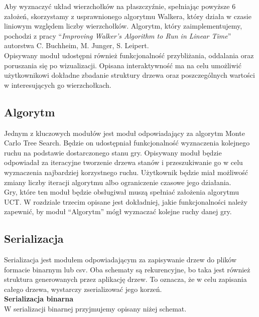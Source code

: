 \documentclass{article}
\begin{document}
	\noindent Aby wyznaczyć układ wierzchołków na płaszczyźnie, spełniając powyższe 6 założeń, skorzystamy z usprawnionego algorytmu Walkera, który działa w czasie liniowym względem liczby wierzchołków. Algorytm, który zaimplementujemy, pochodzi z pracy ``\textit{Improving Walker's Algorithm to Run in Linear Time}'' autorstwa C. Buchheim, M. Junger, S. Leipert. \\
	
	\noindent Opisywany moduł udostępni również funkcjonalność przybliżania, oddalania oraz poruszania się po wizualizacji. Opisana interaktywność ma na celu umożliwić użytkownikowi dokładne zbadanie struktury drzewa oraz poszczególnych wartości w interesujących go wierzchołkach.
	
	\subsection{Algorytm}
	Jednym z kluczowych modułów jest moduł odpowiadający za algorytm Monte Carlo Tree Search. Będzie on udostępniał funkcjonalność wyznaczenia kolejnego ruchu na podstawie dostarczonego stanu gry. Opisywany moduł będzie odpowiadał za iteracyjne tworzenie drzewa stanów i przeszukiwanie go w celu wyznaczenia najbardziej korzystnego ruchu. Użytkownik będzie miał możliwość zmiany liczby iteracji algorytmu albo ograniczenie czasowe jego działania.\\
	
	\noindent Gry, które ten moduł będzie obsługiwał muszą spełniać założenia algorytmu UCT. W rozdziale trzecim opisane jest dokładniej, jakie funkcjonalności należy zapewnić, by moduł ``Algorytm'' mógł wyznaczać kolejne ruchy danej gry.
	
	\clearpage
	
	\subsection{Serializacja}
	Serializacja jest modułem odpowiadającym za zapisywanie drzew do plików formacie binarnym lub csv. Oba schematy są rekurencyjne, bo taka jest również struktura generowanych przez aplikację drzew. To oznacza, że w celu zapisania całego drzewa, wystarczy zserializować jego korzeń.\\
	
	\noindent \textbf{\large Serializacja binarna} \\
	W serializacji binarnej przyjmujemy opisany niżej schemat.\\
\end{document}
